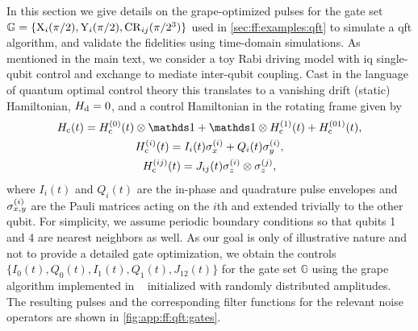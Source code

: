 In this section we give details on the \acrshort{grape}-optimized pulses for the gate set $\mathbb{G} = \lbrace\mathrm{X}_{i}(\pi/2),\mathrm{Y}_{i}(\pi/2),\mathrm{CR}_{ij}(\pi/2^3)\rbrace$ used in \cref{sec:ff:examples:qft} to simulate a \gls{qft} algorithm, and validate the fidelities using time-domain simulations.
As mentioned in the main text, we consider a toy Rabi driving model with \acrshort{iq} single-qubit control and exchange to mediate inter-qubit coupling.
Cast in the language of quantum optimal control theory this translates to a vanishing drift (static) Hamiltonian, $H_{\mathrm{d}} =  0$, and a control Hamiltonian in the rotating frame given by
\begin{gather}
    \Hc(t) = \Hc\gth{0}(t)\otimes\eye + \eye\otimes\Hc\gth{1}(t) + \Hc\gth{01}(t), \\
    \Hc\gth{i}(t) = I_i(t)\sx\gth{i} + Q_i(t)\sy\gth{i}, \\
    \Hc\gth{ij}(t) = J_{ij}(t)\sz\gth{i}\otimes\sz\gth{j},
\end{gather}
where $I_i(t)$ and $Q_i(t)$ are the in-phase and quadrature pulse envelopes and $\sigma_{x,y}^{(i)}$ are the Pauli matrices acting on the $i$th and extended trivially to the other qubit.
For simplicity, we assume periodic boundary conditions so that qubits 1 and 4 are nearest neighbors as well.
As our goal is only of illustrative nature and not to provide a detailed gate optimization, we obtain the controls $\lbrace I_0(t), Q_0(t), I_1(t), Q_1(t), J_{12}(t)\rbrace$ for the gate set $\mathbb{G}$ using the \acrshort{grape} algorithm implemented in \qutip~\cite{Johansson2012} initialized with randomly distributed amplitudes.
The resulting pulses and the corresponding filter functions for the relevant noise operators are shown in \cref{fig:app:ff:qft:gates}.

